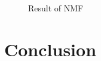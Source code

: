 \documentclass[
10pt, %
a4paper, %
oneside, %
headinclude,footinclude, %
BCOR5mm, %
]{scrartcl}
\begin{document}
\begin{figure}[tb]
    \centering
    \caption{Result of NMF}
    \label{fig:application}
\end{figure}

\newpage
\section{Conclusion}

\newpage
\renewcommand{\refname}{\spacedlowsmallcaps{References}} %




\end{document}

